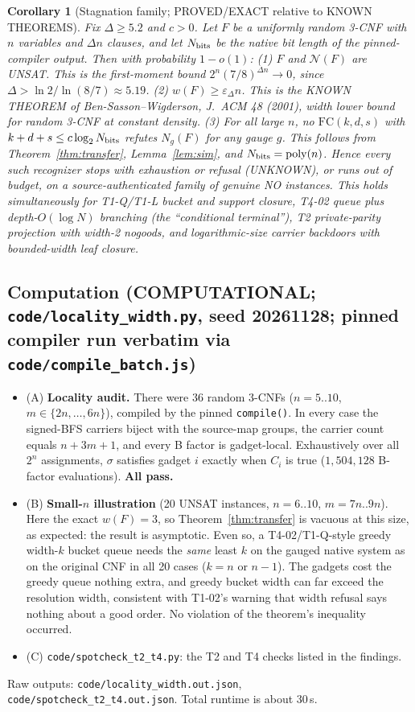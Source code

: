 \documentclass[11pt]{article}
\newtheorem{corollary}[theorem]{Corollary}
\theoremstyle{definition}
\begin{document}
\begin{corollary}[Stagnation family; PROVED/EXACT relative to KNOWN THEOREMS]\label{cor:stag}
Fix $\Delta\ge 5.2$ and $c>0$. Let $F$ be a uniformly random 3-CNF with $n$ variables and $\Delta n$ clauses, and let $N_{\rm bits}$ be the native bit length of the pinned-compiler output. Then with probability $1-o(1)$:
(1) $F$ and $\mathcal N(F)$ are UNSAT. This is the first-moment bound $2^n(7/8)^{\Delta n}\to0$, since $\Delta>\ln2/\ln(8/7)\approx5.19$.
(2) $w(F)\ge\varepsilon_\Delta n$. This is the KNOWN THEOREM of Ben-Sasson--Wigderson, J.~ACM 48 (2001), width lower bound for random 3-CNF at constant density.
(3) For all large $n$, no $\mathrm{FC}(k,d,s)$ with $k+d+s\le c\log_2 N_{\rm bits}$ refutes $N_g(F)$ for any gauge $g$. This follows from Theorem~\ref{thm:transfer}, Lemma~\ref{lem:sim}, and $N_{\rm bits}=\mathrm{poly}(n)$.
Hence every such recognizer stops with exhaustion or refusal (UNKNOWN), or runs out of budget, on a source-authenticated family of genuine NO instances. This holds simultaneously for T1-Q/T1-L bucket and support closure, T4-02 queue plus depth-$O(\log N)$ branching (the ``conditional terminal''), T2 private-parity projection with width-2 nogoods, and logarithmic-size carrier backdoors with bounded-width leaf closure.
\end{corollary}

\subsection*{Computation (COMPUTATIONAL; \texttt{code/locality\_width.py}, seed 20261128; pinned compiler run verbatim via \texttt{code/compile\_batch.js})}
\begin{itemize}
\item[] (A) \textbf{Locality audit.} There were 36 random 3-CNFs ($n=5..10$, $m\in\{2n,\dots,6n\}$), compiled by the pinned \texttt{compile()}. In every case the signed-BFS carriers biject with the source-map groups, the carrier count equals $n+3m+1$, and every B factor is gadget-local. Exhaustively over all $2^n$ assignments, $\sigma$ satisfies gadget $i$ exactly when $C_i$ is true ($1{,}504{,}128$ B-factor evaluations). \textbf{All pass.}
\item[] (B) \textbf{Small-$n$ illustration} (20 UNSAT instances, $n=6..10$, $m=7n..9n$). Here the exact $w(F)=3$, so Theorem~\ref{thm:transfer} is vacuous at this size, as expected: the result is asymptotic. Even so, a T4-02/T1-Q-style greedy width-$k$ bucket queue needs the \emph{same} least $k$ on the gauged native system as on the original CNF in all 20 cases ($k=n$ or $n-1$). The gadgets cost the greedy queue nothing extra, and greedy bucket width can far exceed the resolution width, consistent with T1-02's warning that width refusal says nothing about a good order. No violation of the theorem's inequality occurred.
\item[] (C) \texttt{code/spotcheck\_t2\_t4.py}: the T2 and T4 checks listed in the findings.
\end{itemize}
Raw outputs: \texttt{code/locality\_width.out.json}, \texttt{code/spotcheck\_t2\_t4.out.json}. Total runtime is about 30\,s.
\end{document}
